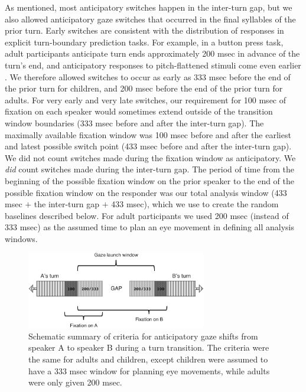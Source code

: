 \documentclass[authoryear, 12pt]{elsarticle}
\begin{document}
As mentioned, most anticipatory switches happen in the inter-turn gap, but we also allowed anticipatory gaze switches that occurred in the final syllables of the prior turn. Early switches are consistent with the distribution of responses in explicit turn-boundary prediction tasks. For example, in a button press task, adult participants anticipate turn ends approximately 200 msec in advance of the turn's end, and anticipatory responses to pitch-flattened stimuli come even earlier \citep{de-ruiter2006}. We therefore allowed switches to occur as early as 333 msec before the end of the prior turn for children, and 200 msec before the end of the prior turn for adults. For very early and very late switches, our requirement for 100 msec of fixation on each speaker would sometimes extend outside of the transition window boundaries (333 msec before and after the inter-turn gap). The maximally available fixation window was 100 msec before and after the earliest and latest possible switch point (433 msec before and after the inter-turn gap). We did not count switches made during the fixation window as anticipatory. We \textit{did} count switches made during the inter-turn gap. The period of time from the beginning of the possible fixation window on the prior speaker to the end of the possible fixation window on the responder was our total analysis window (433 msec $+$ the inter-turn gap $+$ 433 msec), which we use to create the random baselines described below. For adult participants we used 200 msec (instead of 333 msec) as the assumed time to plan an eye movement in defining all analysis windows.

\begin{figure}[t]
\begin{center}
\includegraphics[width=0.7\textwidth]{figures/FIG-AnticipCriteria.png}
\end{center}
\caption{Schematic summary of criteria for anticipatory gaze shifts from speaker A to speaker B during a turn transition. The criteria were the same for adults and children, except children were assumed to have a 333 msec window for planning eye movements, while adults were only given 200 msec.} 
\label{fig:criterion}
\end{figure}
\end{document}
